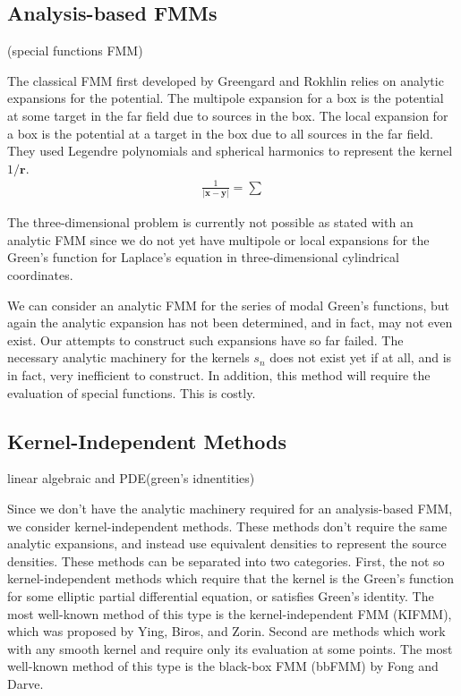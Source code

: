 \documentclass[11pt, oneside]{article}   	%
\begin{document}
\subsection{Analysis-based FMMs}

(special functions FMM)

The classical FMM \cite{GR} first developed by Greengard and Rokhlin relies on analytic expansions for the potential. The multipole expansion for a box is the potential at some target in the far field due to sources in the box. The local expansion for a box is the potential at a target in the box due to all sources in the far field. They used Legendre polynomials and spherical harmonics to represent the kernel $1/\mathbf{r}$.
\begin{align}
\frac{1}{|\mathbf{x}-\mathbf{y}|} = \sum
\end{align}

The three-dimensional problem is currently not possible as stated with an analytic FMM since we do not yet have multipole or local expansions for the Green's function for Laplace's equation in three-dimensional cylindrical coordinates.

We can consider an analytic FMM for the series of modal Green's functions, but again the analytic expansion has not been determined, and in fact, may not even exist. Our attempts to construct such expansions have so far failed. The necessary analytic machinery for the kernels $s_n$ does not exist yet if at all, and is in fact, very inefficient to construct. In addition, this method will require the evaluation of special functions. This is costly.

\subsection{Kernel-Independent Methods}

linear algebraic and PDE(green's idnentities)

Since we don't have the analytic machinery required for an analysis-based FMM, we consider kernel-independent methods. These methods don't require the same analytic expansions, and instead use equivalent densities to represent the source densities. These methods can be separated into two categories. First, the not so kernel-independent methods which require that the kernel is the Green's function for some elliptic partial differential equation, or satisfies Green's identity. The most well-known method of this type is the kernel-independent FMM (KIFMM), which was proposed by Ying, Biros, and Zorin. Second are methods which work with any smooth kernel and require only its evaluation at some points. The most well-known method of this type is the black-box FMM (bbFMM) by Fong and Darve.
\end{document}
